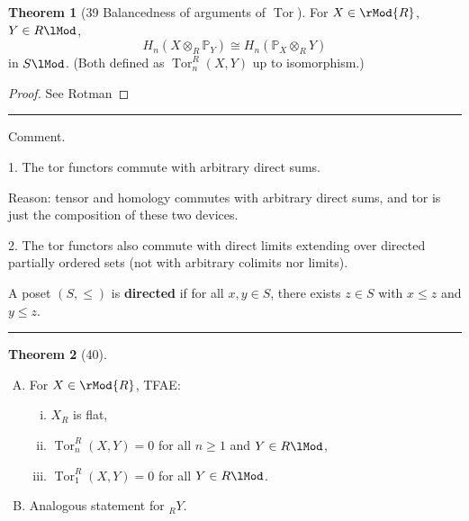 \documentclass[12pt]{article}
\newcommand{\keyword}[1]{\textbf{#1}}
\newcommand{\sepline}{\rule{\textwidth}{0.4pt}}
\theoremstyle{definition}
\newtheorem{theorem}{Theorem}
\renewcommand{\P}{\mathbb{P}}
\newcommand{\<}{\left\langle}
\renewcommand{\>}{\right\rangle}
\newcommand{\iso}{\cong}
\newcommand{\tensor}{\otimes}
\DeclareMathOperator{\Tor}{Tor}
\renewcommand{\_}[1]{{_{#1}}}
\begin{document}
\begin{theorem}[39 Balancedness of arguments of $\Tor$]
    For $X \in \rMod{R}$, $Y \in R\lMod$,
    \[
        H_n(X \tensor_R \P_Y) \iso H_n(\P_X \tensor_R Y)
    \]
    in $S\lMod$.
    (Both defined as $\Tor_n^R(X, Y)$ up to isomorphism.)
\end{theorem}

\begin{proof}
    See Rotman
\end{proof}

\sepline

Comment.

1. The tor functors commute with arbitrary direct sums.

Reason: tensor and homology commutes with arbitrary direct sums, and tor is just the composition of these two devices.

2. The tor functors also commute with direct limits extending over directed partially ordered sets (not with arbitrary colimits nor limits).

A poset $(S, \leq)$ is \keyword{directed} if for all $x, y \in S$, there exists $z \in S$ with $x \leq z$ and $y \leq z$.

\sepline

\begin{theorem}[40]
    \
    \begin{enumerate}[(A)]
        \item For $X \in \rMod{R}$, TFAE:
        \begin{enumerate}[(i)]
            \item $X_R$ is flat,
            \item $\Tor_n^R(X, Y) = 0$ for all $n \geq 1$ and $Y \in R\lMod$,
            \item $\Tor_1^R(X, Y) = 0$ for all $Y \in R\lMod$.
        \end{enumerate}
        \item Analogous statement for $\_RY$.
    \end{enumerate}
\end{theorem}
\end{document}
